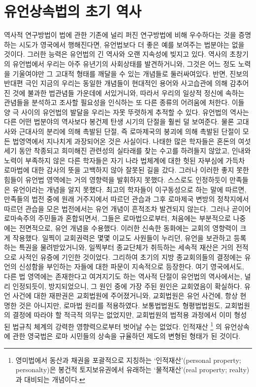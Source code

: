 \chapter{유언상속법의 초기 역사}

역사적 연구방법이
법에 관한
기존에 널리 퍼진 연구방법에 비해 우수하다는 것을
증명하는 시도가
영국에서
행해진다면,
유언법보다 더 좋은 예를 보여주는 법분야는 없을 것이다.
그러한 능력은 유언법의 긴 역사와 오랜 지속성에 빚지고 있다.
역사의 초창기의 유언법에서
우리는
아주 유년기의 사회상태를 발견하거니와,
그것은 어느 정도 노력을 기울여야만
그 고대적 형태를 깨달을 수 있는 개념들로 둘러싸여있다.
반면, 진보의 반대편 극인 지금의 우리는
동일한 개념들이
현대적인 용어와 사고습관에 의해 감추어진 것에
불과한
법관념들 가운데에 서있거니와,
따라서
우리의 일상적 정신에 속하는 관념들을 분석하고 조사할 필요성을
인식하는 또 다른 종류의 어려움에 처한다.
이들 양 극 사이의 유언법의 발달을
우리는
자못 뚜렷하게 추적할 수 있다.
유언법의 역사는
다른 어떤 법분야의 역사보다
봉건제 탄생 시기의 단절을 훨씬 덜 보여준다.
물론
고대사와 근대사의 분리에 의해 촉발된 단절,
즉 로마제국의 붕괴에 의해 촉발된 단절이
모든 법영역에서
지나치게 과장되어온 것은 사실이다.
나태한
많은 학자들은
혼돈의 여섯 세기 동안 착종되고 희미해진 관련성의 실타래를
찾는 수고를 하려들지 않았고,
인내와 노력이 부족하지 않은 다른 학자들은
자기 나라 법체계에 대한 헛된 자부심에 가득차
로마법에 대한 감사의 뜻을 고백하지 않아 잘못된 길을 갔다.
그러나 이러한 좋지 못한 힘들이 유언법 영역에는 거의 영향력을 발휘하지 못했다.
스스로도 인정하듯이 만족들은 유언이라는 개념을 알지 못했다.
최고의 학자들이 이구동성으로 하는 말에 따르면,
만족들의 법전 중에
원래 거주지에서 따르던 관습과 그후
로마제국 변방의 정착지에서 따르던 관습을 모은 법전에서는
유언 개념이 흔적조차 발견되지 않는다.
그러나 곧이어 로마속주의 주민들과 혼합되면서, 그들은
로마법으로부터, 처음에는 부분적으로 나중에는 전면적으로,
유언 개념을 수용했다.
이러한 신속한 동화에는 교회의 영향력이 크게 작용했다.
일찍이 교회권력은 몇몇 이교도 사원들이 누리던,
유언을 보관하고 등록하는 특권을 물려받았거니와,
일찍부터 종교단체가 취득하는 세속적 재산은
거의 전적으로 사적인 유증에 기인한 것이었다.
그리하여 초기의 지방 종교회의들의 결정에는
유언의 신성함을 부인하는 자들에 대한 파문이 지속적으로 등장한다.
여기 영국에서도,
다른 법 영역에는 존재한다고 여겨지기도 하는
역사적 단절이
유언법의 역사에서는, 널리 인정되듯이, 방지되었으니, 그 원인 중에
가장 주된 원인은 교회였음이 확실하다.
유언 사건에 대한 재판권은 교회법원에 주어졌거니와,
교회법원은 유언 사건에, 항상 현명한 것은 아니지만, 로마법 원리를 적용하였다.
보통법법원도 형평법법원도,
교회법원의 결정에 따라야 할 적극적 의무는 없었지만,
교회법원의 법적용 과정에서 이미 형성된 법규칙 체계의 강력한 영향력으로부터
벗어날 수는 없었다.
인적재산%
\footnote{영미법에서 동산과 채권을 포괄적으로 지칭하는
`인적재산'(personal property; personalty)은
봉건적 토지보유권에서 유래하는 `물적재산'(real property; realty)과
대비되는 개념이다.}%
의 유언상속에 관한 영국법은
로마 시민들의 상속을 규율하던 제도의 변형된 형태가 된 것이다.

